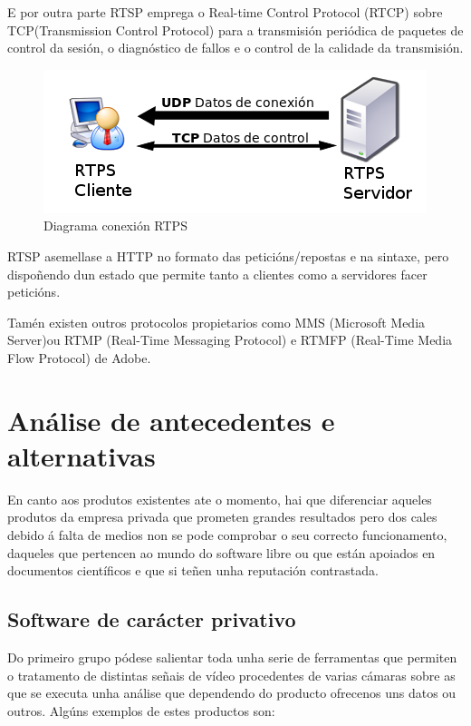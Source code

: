             E por outra parte RTSP emprega o Real-time Control Protocol (RTCP) sobre TCP(Transmission 
            Control Protocol) para a transmisión periódica de paquetes de control da sesión, o
            diagnóstico de fallos e o control de la calidade da transmisión.
            
            \begin{figure}[htp]
            \begin{center}
                \includegraphics[scale=0.6]{figures/RTPS-diagram.png}
                \caption{Diagrama conexión RTPS}
            \label{fig:RTPS-diagram}
            \end{center}
            \end{figure}
            
            RTSP asemellase a HTTP no formato das peticións/repostas e na sintaxe, pero dispoñendo 
            dun estado que permite tanto a clientes como a servidores facer peticións.

            Tamén existen outros protocolos propietarios como MMS (Microsoft Media Server)ou RTMP 
            (Real-Time Messaging Protocol) e RTMFP (Real-Time Media Flow Protocol) de Adobe.
  
\chapter{Análise de antecedentes e alternativas}
	En canto aos produtos existentes ate o momento, hai que diferenciar aqueles produtos da empresa
	privada que prometen grandes resultados pero dos cales debido á falta de medios non se pode 
	comprobar o seu correcto funcionamento, daqueles que pertencen ao mundo do software libre ou que
	están apoiados en documentos científicos e que si teñen unha reputación contrastada.
	
	
	\section{Software de carácter privativo}
	
        Do primeiro grupo pódese salientar toda unha serie de ferramentas que permiten o tratamento de 
        distintas señais de vídeo procedentes de varias cámaras sobre as que se executa unha análise que
        dependendo do producto ofrecenos uns datos ou outros. Algúns exemplos de estes productos son:
        
